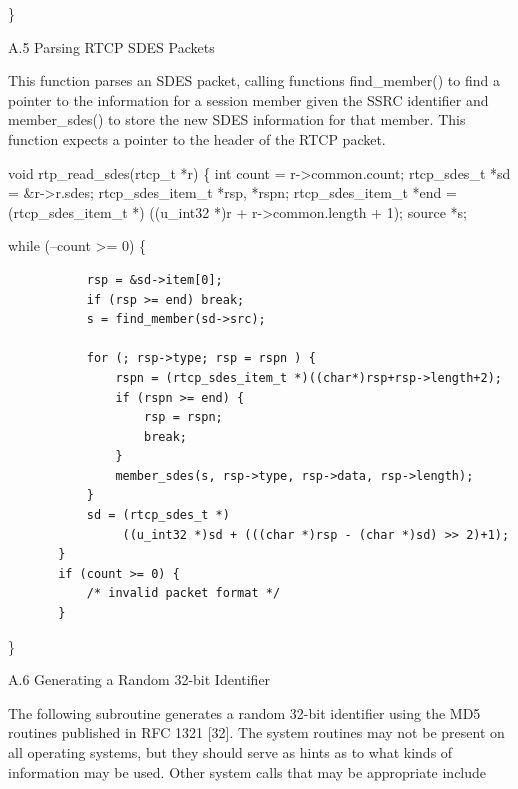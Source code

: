 \documentclass{article}
\begin{document}
\}

A.5 Parsing RTCP SDES Packets

This function parses an SDES packet, calling functions find\_member() to find a pointer to the information for a session member given the SSRC identifier and member\_sdes() to store the new SDES information for that member.  This function expects a pointer to the header of the RTCP packet.

void rtp\_read\_sdes(rtcp\_t *r) \{ int count = r->common.count; rtcp\_sdes\_t *sd = \&r->r.sdes; rtcp\_sdes\_item\_t *rsp, *rspn; rtcp\_sdes\_item\_t *end = (rtcp\_sdes\_item\_t *) ((u\_int32 *)r + r->common.length + 1); source *s;

while (--count >= 0) \{

\begin{verbatim}
           rsp = &sd->item[0];
           if (rsp >= end) break;
           s = find_member(sd->src);

           for (; rsp->type; rsp = rspn ) {
               rspn = (rtcp_sdes_item_t *)((char*)rsp+rsp->length+2);
               if (rspn >= end) {
                   rsp = rspn;
                   break;
               }
               member_sdes(s, rsp->type, rsp->data, rsp->length);
           }
           sd = (rtcp_sdes_t *)
                ((u_int32 *)sd + (((char *)rsp - (char *)sd) >> 2)+1);
       }
       if (count >= 0) {
           /* invalid packet format */
       }
\end{verbatim}

\}

A.6 Generating a Random 32-bit Identifier

The following subroutine generates a random 32-bit identifier using the MD5 routines published in RFC 1321 [32].  The system routines may not be present on all operating systems, but they should serve as hints as to what kinds of information may be used.  Other system calls that may be appropriate include
\end{document}

